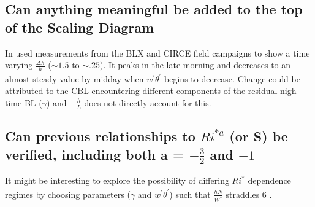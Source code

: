 \subsection{Can anything meaningful be added to the top of the Scaling Diagram}

In \cite{StullNelEl} \citeauthor{StullNelEl} used measurements from the BLX and CIRCE field campaigns 
to show a time varying $\frac{\Delta h}{h}$ ($\sim1.5$ to $\sim .25$).  It peaks in the late morning
and decreases to an almost steady value by midday when $\overline{w^{'}\theta^{'}}$ begins to decrease. Change could be attributed to the CBL encountering different components of the residual nigh-time BL ($\gamma$) and  $-\frac{h}{L}$ does not directly account for this.      

\subsection{Can previous relationships to $Ri^{*a}$ (or S) be verified, including both a = $-\frac{3}{2}$ and $-1$}

It might be interesting to explore the possibility of differing $Ri^{*}$ dependence regimes by choosing parameters 
($\gamma$ and $\overline{w^{'}\theta^{'}}$) such that $\frac{hN}{W^{*}}$ straddles 6 \cite{Turner86}. 

\endinput

Any text after an \endinput is ignored.
You could put scraps here or things in progress.



